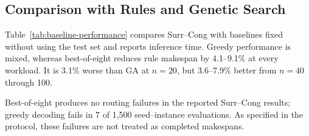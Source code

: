 \subsection{Comparison with Rules and Genetic Search}

Table~\ref{tab:baseline-performance} compares Surr--Cong with baselines fixed
without using the test set and reports inference time. Greedy performance is
mixed, whereas best-of-eight reduces rule makespan by 4.1--9.1\% at every
workload. It is 3.1\% worse than GA at $n=20$, but 3.6--7.9\% better from
$n=40$ through 100.

\begin{table}[!ht]
\caption{Executed makespan and scheduling time.}
\label{tab:baseline-performance}
\label{tab:inference-time}
\centering
\scriptsize
\setlength{\tabcolsep}{2.0pt}
\end{table}

Best-of-eight produces no routing failures in the reported Surr--Cong results;
greedy decoding fails in 7 of 1,500 seed--instance evaluations. As specified in
the protocol, these failures are not treated as completed makespans.

